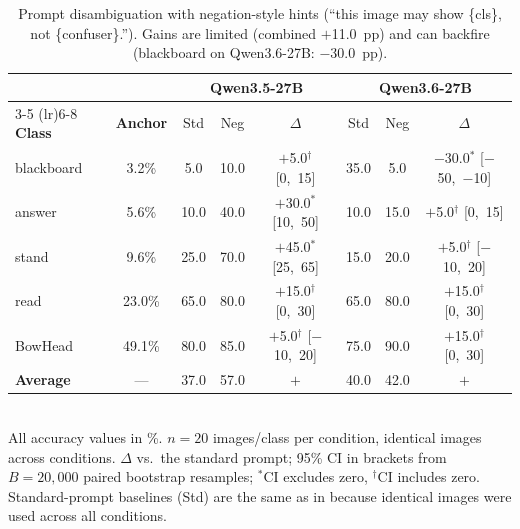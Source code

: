 \documentclass[11pt,a4paper]{article}
\begin{document}
\begin{table}[t]
\caption{Prompt disambiguation with negation-style hints (``this image may show \{cls\}, not \{confuser\}.''). Gains are limited (combined $+$11.0~pp) and can backfire (blackboard on Qwen3.6-27B: $-$30.0~pp).}
\label{tab:prompt_opt_negation}
\centering
\footnotesize
\setlength{\tabcolsep}{3pt}
\begin{tabular}{lccccccc}
\toprule
& & \multicolumn{3}{c}{\textbf{Qwen3.5-27B}} & \multicolumn{3}{c}{\textbf{Qwen3.6-27B}} \\
\cmidrule(lr){3-5} \cmidrule(lr){6-8}
\textbf{Class} & \textbf{Anchor} & Std & Neg & $\Delta$ & Std & Neg & $\Delta$ \\
\midrule
blackboard & 3.2\% & 5.0 & 10.0 & $+$5.0$^\dagger$ [0,~15] & 35.0 & 5.0 & $-$30.0$^*$ [$-$50,~$-$10] \\
answer & 5.6\% & 10.0 & 40.0 & $+$30.0$^*$ [10,~50] & 10.0 & 15.0 & $+$5.0$^\dagger$ [0,~15] \\
stand & 9.6\% & 25.0 & 70.0 & $+$45.0$^*$ [25,~65] & 15.0 & 20.0 & $+$5.0$^\dagger$ [$-$10,~20] \\
read & 23.0\% & 65.0 & 80.0 & $+$15.0$^\dagger$ [0,~30] & 65.0 & 80.0 & $+$15.0$^\dagger$ [0,~30] \\
BowHead & 49.1\% & 80.0 & 85.0 & $+$5.0$^\dagger$ [$-$10,~20] & 75.0 & 90.0 & $+$15.0$^\dagger$ [0,~30] \\
\textbf{Average} & --- & 37.0 & 57.0 & \textbf{\boldmath$+$\unboldmath20.0} & 40.0 & 42.0 & \textbf{\boldmath$+$\unboldmath2.0} \\
\bottomrule
\end{tabular}
\\[2pt]
\footnotesize{All accuracy values in \%. $n=20$ images/class per condition, identical images across conditions. $\Delta$ vs.\ the standard prompt; 95\% CI in brackets from $B=20{,}000$ paired bootstrap resamples; $^*$CI excludes zero, $^\dagger$CI includes zero. Standard-prompt baselines (Std) are the same as in  because identical images were used across all conditions.}
\end{table}
\end{document}
